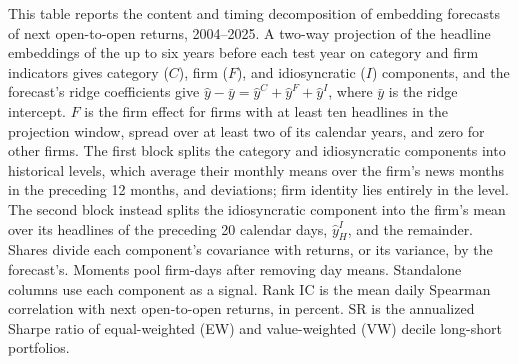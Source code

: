\begin{table}[htbp]
\centering
\caption{Content and Timing Decomposition of the Embedding Forecast}
\label{tab:tabA_decomposition}
\begin{minipage}{\linewidth}\footnotesize
This table reports the content and timing decomposition of embedding forecasts of next open-to-open returns, 2004--2025. A two-way projection of the headline embeddings of the up to six years before each test year on category and firm indicators gives category ($C$), firm ($F$), and idiosyncratic ($I$) components, and the forecast's ridge coefficients give $\hat y-\bar y=\hat y^C+\hat y^F+\hat y^I$, where $\bar y$ is the ridge intercept. $F$ is the firm effect for firms with at least ten headlines in the projection window, spread over at least two of its calendar years, and zero for other firms. The first block splits the category and idiosyncratic components into historical levels, which average their monthly means over the firm's news months in the preceding 12 months, and deviations; firm identity lies entirely in the level. The second block instead splits the idiosyncratic component into the firm's mean over its headlines of the preceding 20 calendar days, $\hat y^I_H$, and the remainder. Shares divide each component's covariance with returns, or its variance, by the forecast's. Moments pool firm-days after removing day means. Standalone columns use each component as a signal. Rank IC is the mean daily Spearman correlation with next open-to-open returns, in percent. SR is the annualized Sharpe ratio of equal-weighted (EW) and value-weighted (VW) decile long-short portfolios.
\end{minipage}
\medskip


\end{table}
